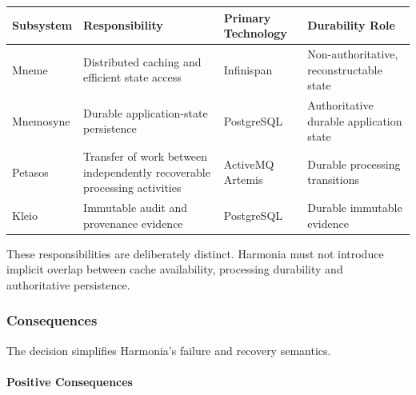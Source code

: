 \begin{center}
    \begin{tabular}{p{} p{} p{} p{}}
        \hline
        \textbf{Subsystem} & \textbf{Responsibility} & \textbf{Primary Technology} & \textbf{Durability Role} \\
        \hline
        Mneme & Distributed caching and efficient state access & Infinispan & Non-authoritative, reconstructable state \\
        Mnemosyne & Durable application-state persistence & PostgreSQL & Authoritative durable application state \\
        Petasos & Transfer of work between independently recoverable processing activities & ActiveMQ Artemis & Durable processing transitions \\
        Kleio & Immutable audit and provenance evidence & PostgreSQL & Durable immutable evidence \\
        \hline
    \end{tabular}
\end{center}

These responsibilities are deliberately distinct. Harmonia must not introduce implicit overlap between cache availability, processing durability and authoritative persistence.

\subsubsection{Consequences}

The decision simplifies Harmonia's failure and recovery semantics.

\paragraph{Positive Consequences}

